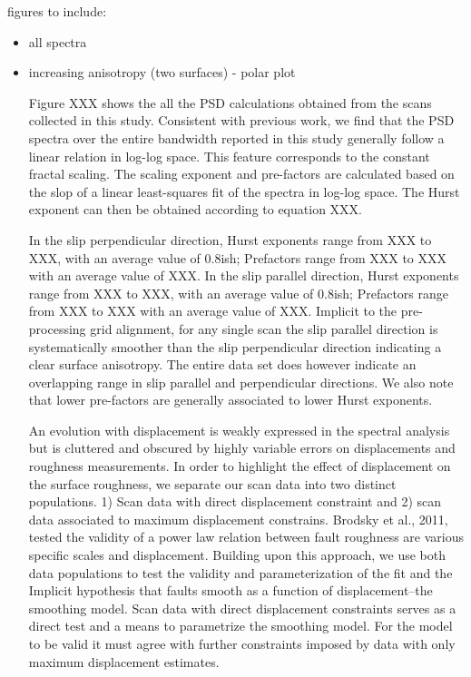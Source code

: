 \documentclass[12pt,a4paper]{article}
\begin{document}
figures to include:
\begin{itemize}
\item all spectra
\item increasing anisotropy (two surfaces) - polar plot

Figure XXX shows the all the PSD calculations obtained from the scans collected in this study. Consistent with previous work, we find that the PSD spectra over the entire bandwidth reported in this study generally follow a linear relation in log-log space. This feature corresponds to the constant fractal scaling. The scaling exponent and pre-factors are calculated based on the slop of a linear least-squares fit of the spectra in log-log space. The Hurst exponent can then be obtained according to equation XXX.

In the slip perpendicular direction, Hurst exponents range from XXX to XXX, with an average value of 0.8ish; Prefactors range from  XXX to XXX with an average value of XXX. In the slip parallel direction, Hurst exponents range from XXX to XXX, with an average value of 0.8ish; Prefactors range from  XXX to XXX with an average value of XXX. Implicit to the pre-processing grid alignment, for any single scan the slip parallel direction is systematically smoother than the slip perpendicular direction indicating a clear surface anisotropy. The entire data set does however indicate an overlapping range in slip parallel and perpendicular directions. We also note that lower pre-factors are generally associated to lower Hurst exponents.

An evolution with displacement is weakly expressed in the spectral analysis but is cluttered and obscured by highly variable errors on displacements and roughness measurements. In order to highlight the effect of displacement on the surface roughness, we separate our scan data into two distinct populations. 1) Scan data with direct displacement constraint and 2) scan data associated to maximum displacement constrains.  Brodsky et al., 2011, tested the validity of a power law relation between fault roughness are various specific scales and displacement. Building upon this approach, we use both data populations to test the validity and parameterization of the fit and the Implicit hypothesis that faults smooth as a function of displacement--the smoothing model. Scan data with direct displacement constraints serves as a direct test and a means to parametrize the smoothing model. For the model to be valid it must agree with further constraints imposed by data with only maximum displacement estimates.


\end{itemize}
\end{document}
